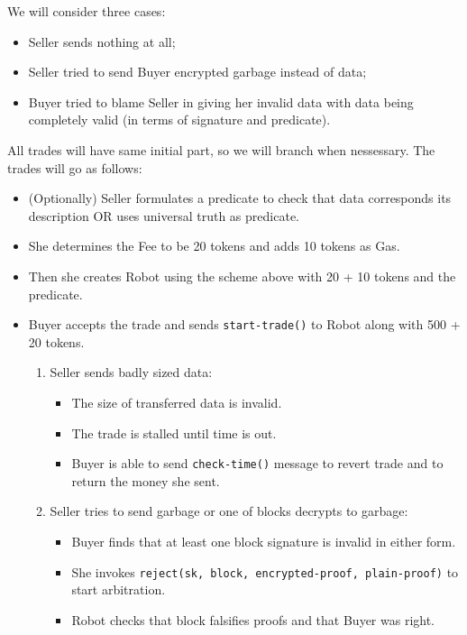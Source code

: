 We will consider three cases:
\begin{itemize}
  \item Seller sends nothing at all;
  \item Seller tried to send Buyer encrypted garbage instead of data;
  \item Buyer tried to blame Seller in giving her invalid data with data being completely valid (in terms of signature and predicate).
\end{itemize}

All trades will have same initial part, so we will branch when nessessary.
The trades will go as follows:
\begin{itemize}
  \item (Optionally) Seller formulates a predicate to check that data corresponds its description OR uses universal truth as predicate.

  \item She determines the Fee to be 20 tokens and adds 10 tokens as Gas.

  \item Then she creates Robot using the scheme above with 20 + 10 tokens and the predicate.

  \item Buyer accepts the trade and sends \verb|start-trade()| to Robot along with 500 + 20 tokens.

  \begin{enumerate}
    \item Seller sends badly sized data:
      \begin{itemize}
        \item The size of transferred data is invalid.
        \item The trade is stalled until time is out.
        \item Buyer is able to send \verb|check-time()| message to revert trade and to return the money she sent.
      \end{itemize}
    \item Seller tries to send garbage or one of blocks decrypts to garbage:
      \begin{itemize}
        \item Buyer finds that at least one block signature is invalid in either form.

        \item She invokes \verb|reject(sk, block, encrypted-proof, plain-proof)| to start arbitration.

        \item Robot checks that block falsifies proofs and that Buyer was right.


\end{itemize}
\end{enumerate}
\end{itemize}
